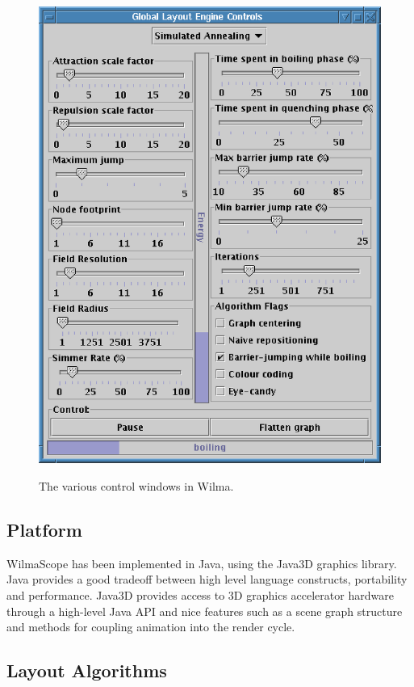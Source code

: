 \documentclass[runningheads]{cl2emult}
\begin{document}
\begin{figure}
{{    \includegraphics{figures/wilma-simannealcontrols.eps}}}
  \caption{The various control windows in Wilma.}
\end{figure}

\subsection{Platform}

WilmaScope has been implemented in Java, using the Java3D graphics library.
Java provides a good tradeoff between high level language constructs,
portability and performance.  Java3D provides access to 3D graphics accelerator hardware through
a high-level Java API and nice features such as a scene graph
structure and methods for coupling animation into the render cycle.

\subsection{Layout Algorithms}
\end{document}

